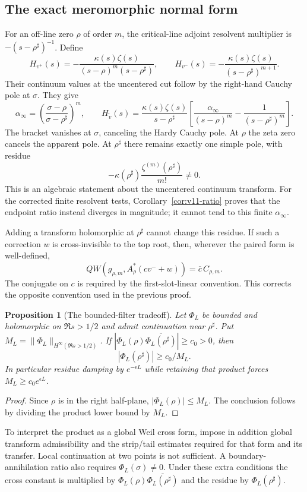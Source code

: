 \documentclass[11pt]{article}
\newtheorem{proposition}[theorem]{Proposition}
\theoremstyle{remark}
\begin{document}
\subsection*{The exact meromorphic normal form}
For an off-line zero $\rho$ of order $m$, the critical-line adjoint
resolvent multiplier is $-(s-\rho^\sharp)^{-1}$. Define
\[
 H_{v^+}(s)=-\frac{\kappa(s)\zeta(s)}{(s-\rho)^m(s-\rho^\sharp)},
 \qquad
 H_{v^-}(s)=-\frac{\kappa(s)\zeta(s)}{(s-\rho^\sharp)^{m+1}}.
\]
Their continuum values at the uncentered cut follow by the right-hand
Cauchy pole at $\sigma$. They give
\[
 \alpha_\infty=
 \left(\frac{\sigma-\rho}{\sigma-\rho^\sharp}\right)^m,
 \qquad
 H_{\widetilde v}(s)=\frac{\kappa(s)\zeta(s)}{s-\rho^\sharp}
 \left[\frac{\alpha_\infty}{(s-\rho)^m}
              -\frac1{(s-\rho^\sharp)^m}\right].
\]
The bracket vanishes at $\sigma$, canceling the Hardy Cauchy pole.
At $\rho$ the zeta zero cancels the apparent pole. At $\rho^\sharp$
there remains exactly one simple pole, with residue
\begin{equation}\label{eq:v1-pole-residue}
 -\kappa(\rho^\sharp)\frac{\zeta^{(m)}(\rho^\sharp)}{m!}\ne0.
\end{equation}
This is an algebraic statement about the uncentered continuum transform.
For the corrected finite resolvent tests, Corollary~\ref{cor:v11-ratio}
proves that the endpoint ratio instead diverges in magnitude; it cannot
tend to this finite $\alpha_\infty$.

Adding a transform holomorphic at $\rho^\sharp$ cannot change this
residue. If such a correction $w$ is cross-invisible to the top root,
then, wherever the paired form is well-defined,
\[
 QW(g_{\rho,m},A_\rho^*(c v^-+w))
       =\overline c\,C_{\rho,m}.
\]
The conjugate on $c$ is required by the first-slot-linear convention.
This corrects the opposite convention used in the previous proof.

\begin{proposition}[The bounded-filter tradeoff]\label{prop:v1-filter}
Let $\Phi_L$ be bounded and holomorphic on $\Re s>1/2$ and admit
continuation near $\rho^\sharp$. Put
$M_L=\|\Phi_L\|_{H^\infty(\Re s>1/2)}$.
If $|\Phi_L(\rho)\overline{\Phi_L(\rho^\sharp)}|\ge c_0>0$, then
\[
 |\Phi_L(\rho^\sharp)|\ge c_0/M_L.
\]
In particular residue damping by $e^{-\epsilon L}$ while retaining
that product forces $M_L\ge c_0e^{\epsilon L}$.
\end{proposition}
\begin{proof}
Since $\rho$ is in the right half-plane, $|\Phi_L(\rho)|\le M_L$.
The conclusion follows by dividing the product lower bound by $M_L$.
\end{proof}
To interpret the product as a global Weil cross form, impose in addition
global transform admissibility and the strip/tail estimates required for
that form and its transfer. Local continuation at two points is not
sufficient. A boundary-annihilation ratio also requires
$\Phi_L(\sigma)\ne0$. Under these extra conditions the cross constant
is multiplied by $\Phi_L(\rho)\overline{\Phi_L(\rho^\sharp)}$ and
the residue by $\Phi_L(\rho^\sharp)$.
\end{document}
